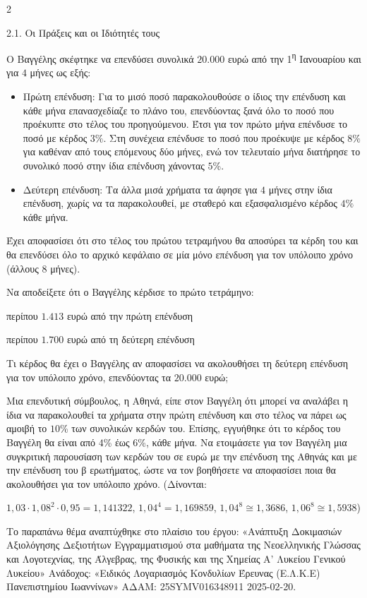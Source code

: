 \begin{ylh}{2}
    \item 2.1. Οι Πράξεις και οι Ιδιότητές τους
\end{ylh}
Ο Βαγγέλης σκέφτηκε να επενδύσει συνολικά $20.000$ ευρώ από την 1\textsuperscript{η} Ιανουαρίου και για $4$ μήνες ως εξής:

\begin{itemize}
\item
  Πρώτη επένδυση: Για το μισό ποσό παρακολουθούσε ο ίδιος την επένδυση και κάθε μήνα επανασχεδίαζε το πλάνο του, επενδύοντας ξανά όλο το ποσό που προέκυπτε στο τέλος του προηγούμενου. Έτσι για τον πρώτο μήνα επένδυσε το ποσό με κέρδος $3\%$. Στη συνέχεια επένδυσε το ποσό που προέκυψε με κέρδος $8\%$ για καθέναν από τους επόμενους δύο μήνες, ενώ τον τελευταίο μήνα διατήρησε το συνολικό ποσό στην ίδια επένδυση χάνοντας $5$\%.
\item
  Δεύτερη επένδυση: Τα άλλα μισά χρήματα τα άφησε για $4$ μήνες στην ίδια επένδυση, χωρίς να τα παρακολουθεί, με σταθερό και εξασφαλισμένο κέρδος $4\%$ κάθε μήνα.
\end{itemize}

Έχει αποφασίσει ότι στο τέλος του πρώτου τετραμήνου θα αποσύρει τα κέρδη του και θα επενδύσει όλο το αρχικό κεφάλαιο σε μία μόνο επένδυση για τον υπόλοιπο χρόνο (άλλους $8$ μήνες).

\begin{alist}
\item Να αποδείξετε ότι ο Βαγγέλης κέρδισε το πρώτο τετράμηνο:

\begin{rlist}
\item περίπου $1.413$ ευρώ από την πρώτη επένδυση
\item περίπου $1.700$ ευρώ από τη δεύτερη επένδυση
\end{rlist}
\item Τι κέρδος θα έχει ο Βαγγέλης αν αποφασίσει να ακολουθήσει τη δεύτερη επένδυση για τον υπόλοιπο χρόνο, επενδύοντας τα $20.000$ ευρώ;
\item Μια επενδυτική σύμβουλος, η Αθηνά, είπε στον Βαγγέλη ότι μπορεί να αναλάβει η ίδια να παρακολουθεί τα χρήματα στην πρώτη επένδυση και στο τέλος να πάρει ως αμοιβή το $10$\% των συνολικών κερδών του. Επίσης, εγγυήθηκε ότι το κέρδος του Βαγγέλη θα είναι από $4$\% έως $6$\%, κάθε μήνα. Να ετοιμάσετε για τον Βαγγέλη μια συγκριτική παρουσίαση των κερδών του σε ευρώ με την επένδυση της Αθηνάς και με την επένδυση του β ερωτήματος, ώστε να τον βοηθήσετε να αποφασίσει ποια θα ακολουθήσει για τον υπόλοιπο χρόνο.
(Δίνονται:

$1,03 \cdot {1,08}^{2} \cdot 0,95 = 1,141322$, ${1,04}^{4} = 1,169859$, ${1,04}^{8} \cong 1,3686$, ${1,06}^{8} \cong 1,5938$)

{\footnotesize Το παραπάνω θέμα αναπτύχθηκε στο πλαίσιο του έργου: «Ανάπτυξη Δοκιμασιών Αξιολόγησης Δεξιοτήτων Εγγραμματισμού στα μαθήματα της Νεοελληνικής Γλώσσας και Λογοτεχνίας, της Άλγεβρας, της Φυσικής και της Χημείας Α' Λυκείου Γενικού Λυκείου» Ανάδοχος: «Ειδικός Λογαριασμός Κονδυλίων Έρευνας (Ε.Λ.Κ.Ε) Πανεπιστημίου Ιωαννίνων» ΑΔΑΜ: 25SYMV016348911 2025-02-20.}
\end{alist}

